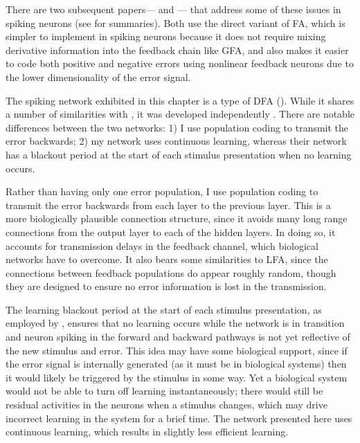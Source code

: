 There are two subsequent papers---%
\textcite{Neftci2017} and \textcite{Samadi2017}---%
that address some of these issues in spiking neurons
(see  for summaries).
Both use the direct variant of FA,
which is simpler to implement in spiking neurons
because it does not require mixing derivative information
into the feedback chain like GFA,
and also makes it easier to code both positive and negative errors
using nonlinear feedback neurons
due to the lower dimensionality of the error signal.

\begin{figure}
  \centering
  
\end{figure}

The spiking network exhibited in this chapter is a type of DFA ().
While it shares a number of similarities with \textcite{Neftci2017},
it was developed independently \parencite{Hunsberger2017}.
There are notable differences between the two networks:
1) I use population coding to transmit the error backwards;
2) my network uses continuous learning,
whereas their network has a blackout period at the start of each stimulus presentation
when no learning occurs.

Rather than having only one error population,
I use population coding to transmit the error backwards
from each layer to the previous layer.
This is a more biologically plausible connection structure,
since it avoids many long range connections from the output layer
to each of the hidden layers.
In doing so,
it accounts for transmission delays in the feedback channel,
which biological networks have to overcome.
It also bears some similarities to LFA,
since the connections between feedback populations do appear roughly random,
though they are designed to ensure no error information is lost in the transmission.

The learning blackout period at the start of each stimulus presentation,
as employed by \textcite{Neftci2017},
ensures that no learning occurs while the network is in transition
and neuron spiking in the forward and backward pathways
is not yet reflective of the new stimulus and error.
This idea may have some biological support,
since if the error signal is internally generated (as it must be in biological systems)
then it would likely be triggered by the stimulus in some way.
Yet a biological system would not be able to turn off learning instantaneously;
there would still be residual activities in the neurons when a stimulus changes,
which may drive incorrect learning in the system for a brief time.
The network presented here uses continuous learning,
which results in slightly less efficient learning.

